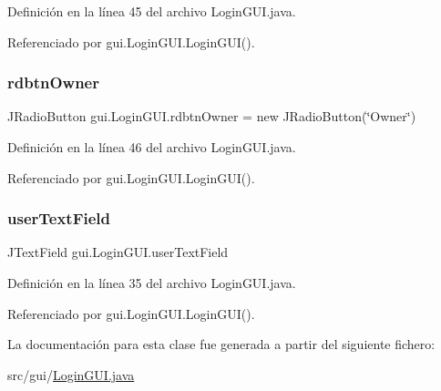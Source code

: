 Definición en la línea 45 del archivo Login\+G\+U\+I.\+java.



Referenciado por gui.\+Login\+G\+U\+I.\+Login\+G\+U\+I().

\mbox{\label{classgui_1_1_login_g_u_i_ad9b6b69331716f550fb139535ee5963a}} 
\subsubsection{\texorpdfstring{rdbtnOwner}{rdbtnOwner}}
{\footnotesize\ttfamily J\+Radio\+Button gui.\+Login\+G\+U\+I.\+rdbtn\+Owner = new J\+Radio\+Button(\char`\"{}Owner\char`\"{})\hspace{0.3cm}{\ttfamily [private]}}



Definición en la línea 46 del archivo Login\+G\+U\+I.\+java.



Referenciado por gui.\+Login\+G\+U\+I.\+Login\+G\+U\+I().

\mbox{\label{classgui_1_1_login_g_u_i_acf4a83606449712f7d8e4e09eef07aee}} 
\subsubsection{\texorpdfstring{userTextField}{userTextField}}
{\footnotesize\ttfamily J\+Text\+Field gui.\+Login\+G\+U\+I.\+user\+Text\+Field\hspace{0.3cm}{\ttfamily [private]}}



Definición en la línea 35 del archivo Login\+G\+U\+I.\+java.



Referenciado por gui.\+Login\+G\+U\+I.\+Login\+G\+U\+I().



La documentación para esta clase fue generada a partir del siguiente fichero\+:\begin{DoxyCompactItemize}
\item 
src/gui/\mbox{\hyperlink{_login_g_u_i_8java}{Login\+G\+U\+I.\+java}}\end{DoxyCompactItemize}
